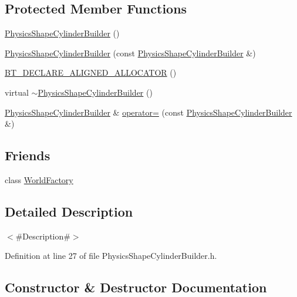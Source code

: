 \subsection*{Protected Member Functions}
\begin{DoxyCompactItemize}
\item 
\mbox{\hyperlink{classnjli_1_1_physics_shape_cylinder_builder_ab9ca148d4bf3d6c9f98ad3326e299bec}{Physics\+Shape\+Cylinder\+Builder}} ()
\item 
\mbox{\hyperlink{classnjli_1_1_physics_shape_cylinder_builder_ac76b3bf33173f1947e0eedb98639da8c}{Physics\+Shape\+Cylinder\+Builder}} (const \mbox{\hyperlink{classnjli_1_1_physics_shape_cylinder_builder}{Physics\+Shape\+Cylinder\+Builder}} \&)
\item 
\mbox{\hyperlink{classnjli_1_1_physics_shape_cylinder_builder_a901b23092dc351ca0a3908a7e09559a3}{B\+T\+\_\+\+D\+E\+C\+L\+A\+R\+E\+\_\+\+A\+L\+I\+G\+N\+E\+D\+\_\+\+A\+L\+L\+O\+C\+A\+T\+OR}} ()
\item 
virtual \mbox{\hyperlink{classnjli_1_1_physics_shape_cylinder_builder_ac510e95057eed0ffc55f8eeecb65dde4}{$\sim$\+Physics\+Shape\+Cylinder\+Builder}} ()
\item 
\mbox{\hyperlink{classnjli_1_1_physics_shape_cylinder_builder}{Physics\+Shape\+Cylinder\+Builder}} \& \mbox{\hyperlink{classnjli_1_1_physics_shape_cylinder_builder_a20d26cb7528ccc4e92a5cc16701993bb}{operator=}} (const \mbox{\hyperlink{classnjli_1_1_physics_shape_cylinder_builder}{Physics\+Shape\+Cylinder\+Builder}} \&)
\end{DoxyCompactItemize}
\subsection*{Friends}
\begin{DoxyCompactItemize}
\item 
class \mbox{\hyperlink{classnjli_1_1_physics_shape_cylinder_builder_acb96ebb09abe8f2a37a915a842babfac}{World\+Factory}}
\end{DoxyCompactItemize}


\subsection{Detailed Description}
$<$\#\+Description\#$>$ 

Definition at line 27 of file Physics\+Shape\+Cylinder\+Builder.\+h.



\subsection{Constructor \& Destructor Documentation}
\mbox{\label{classnjli_1_1_physics_shape_cylinder_builder_ab9ca148d4bf3d6c9f98ad3326e299bec}} 
